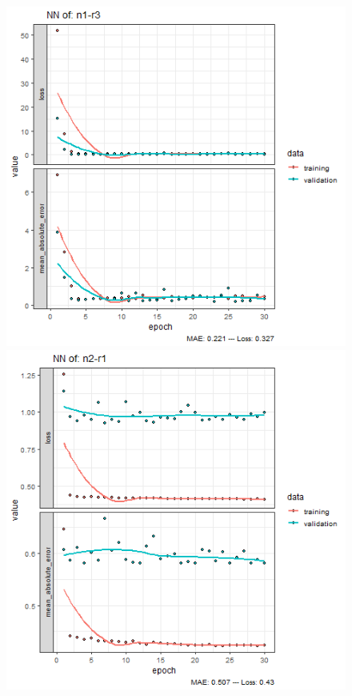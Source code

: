 \documentclass{FR16}
\begin{document}
\begin{figure}[!htb]
\begin{minipage}{0.33\textwidth}
   \end{minipage}
   \begin{minipage}{0.33\textwidth}
     \centering
     \includegraphics[width=1\linewidth]{figures/NN-n1-r3.png} 
   \end{minipage}\hfill
   \begin{minipage}{0.33\textwidth}
     \centering
     \includegraphics[width=1\linewidth]{figures/NN-n2-r1.png}

\end{minipage}
\end{figure}
\end{document}
